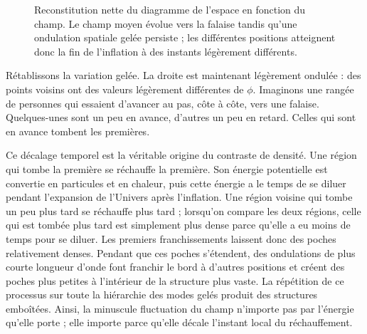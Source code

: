 \begin{figure}[htbp]
\centering
\begin{coursefitfigure}
\end{coursefitfigure}
\caption{Reconstitution nette du diagramme de l’espace en fonction du champ. Le champ moyen évolue vers la falaise tandis qu’une ondulation spatiale gelée persiste ; les différentes positions atteignent donc la fin de l’inflation à des instants légèrement différents.}
\label{fig:c10-cliff-reconstruction}
\end{figure}

Rétablissons la variation gelée. La droite est maintenant légèrement ondulée : des points voisins ont des valeurs légèrement différentes de \(\phi\). Imaginons une rangée de personnes qui essaient d’avancer au pas, côte à côte, vers une falaise. Quelques-unes sont un peu en avance, d’autres un peu en retard. Celles qui sont en avance tombent les premières.

Ce décalage temporel est la véritable origine du contraste de densité. Une région qui tombe la première se réchauffe la première. Son énergie potentielle est convertie en particules et en chaleur, puis cette énergie a le temps de se diluer pendant l’expansion de l’Univers après l’inflation. Une région voisine qui tombe un peu plus tard se réchauffe plus tard ; lorsqu’on compare les deux régions, celle qui est tombée plus tard est simplement plus dense parce qu’elle a eu moins de temps pour se diluer. Les premiers franchissements laissent donc des poches relativement denses. Pendant que ces poches s’étendent, des ondulations de plus courte longueur d’onde font franchir le bord à d’autres positions et créent des poches plus petites à l’intérieur de la structure plus vaste. La répétition de ce processus sur toute la hiérarchie des modes gelés produit des structures emboîtées. Ainsi, la minuscule fluctuation du champ n’importe pas par l’énergie qu’elle porte ; elle importe parce qu’elle décale l’instant local du réchauffement.

